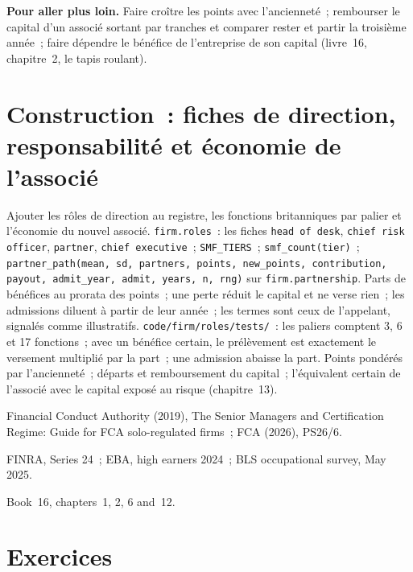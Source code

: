 \textbf{Pour aller plus loin.} Faire croître les points avec l'ancienneté~; rembourser le capital d'un associé sortant par tranches et comparer
rester et partir la troisième année~; faire dépendre le bénéfice de l'entreprise de son capital (livre~16, chapitre~2,
le tapis roulant).

\section{Construction~: fiches de direction, responsabilité et économie de l'associé}\label{bld:in:leadership-roles:roles}

\begin{build}
 Ajouter les rôles de direction au registre, les fonctions britanniques par palier et l'économie du nouvel associé.
 \texttt{firm.roles}~: les fiches \texttt{head of desk}, \texttt{chief risk officer}, \texttt{partner},
\texttt{chief executive}~; \texttt{SMF\_TIERS}~; \texttt{smf\_count(tier)}~;
\texttt{partner\_path(mean, sd, partners, points, new\_points, contribution, payout, admit\_year, admit, years, n, rng)} sur \texttt{firm.partnership}.
 Parts de bénéfices au prorata des points~; une perte réduit le capital et ne verse rien~; les admissions diluent à partir de leur année~; les termes
sont ceux de l'appelant, signalés comme illustratifs.
 \texttt{code/firm/roles/tests/}~: les paliers comptent 3, 6 et 17 fonctions~; avec un bénéfice certain,
le prélèvement est exactement le versement multiplié par la part~; une admission abaisse la part.
 Points pondérés par l'ancienneté~; départs et remboursement du capital~; l'équivalent certain de l'associé avec
le capital exposé au risque (chapitre~13).
\end{build}

\begin{omsources}
\item Financial Conduct Authority (2019), The Senior Managers and Certification Regime: Guide for FCA solo-regulated
firms~; FCA (2026), PS26/6.
\item FINRA, Series 24~; EBA, high earners 2024~; BLS occupational survey, May 2025.
\item Book~16, chapters~1, 2, 6 and~12.
\end{omsources}

\section{Exercices}

